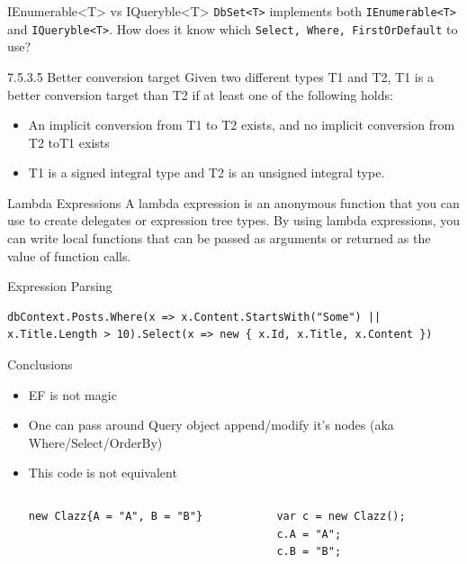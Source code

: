 \documentclass{bredelebeamer}
\begin{document}
\begin{frame}{IEnumerable<T> vs IQueryble<T>}
    \lstinline{DbSet<T>} implements both \lstinline{IEnumerable<T>} and \lstinline{IQueryble<T>}.
    How does it know which \lstinline{Select, Where, FirstOrDefault} to use?
    \pause
    \begin{exampleblock}{7.5.3.5 Better conversion target}
        Given two different types T1 and T2, T1 is a better conversion target than T2 if at least one of the following holds:
        \begin{itemize}
            \item An implicit conversion from T1 to T2 exists, and no implicit conversion from T2 toT1 exists
            \item T1 is a signed integral type and T2 is an unsigned integral type.
        \end{itemize}
    \end{exampleblock}
    \begin{exampleblock}{Lambda Expressions}
        A lambda expression is an anonymous function that you can use to create delegates or expression tree types. By using lambda expressions, you can write local functions that can be passed as arguments or returned as the value of function calls.
    \end{exampleblock}
\end{frame}

\begin{frame}[fragile]{Expression Parsing}
    \begin{lstlisting}
dbContext.Posts.Where(x => x.Content.StartsWith("Some") || x.Title.Length > 10).Select(x => new { x.Id, x.Title, x.Content })
    \end{lstlisting}
    
\end{frame}

\begin{frame}[fragile]{Conclusions}
    \begin{itemize}
        \item<1-> EF is not magic
        \item<2-> One can pass around Query object append/modify it's nodes (aka Where/Select/OrderBy)
        \item<3-> { This code is not equivalent
        \begin{columns}
            \begin{column}{0.5\textwidth}
                \begin{lstlisting}
new Clazz{A = "A", B = "B"}
                \end{lstlisting}
            \end{column}
            \begin{column}{0.5\textwidth}
                \begin{lstlisting}
var c = new Clazz();
c.A = "A";
c.B = "B";
                \end{lstlisting}
            \end{column}
        \end{columns}
        }
    \end{itemize}
\end{frame}
\end{document}

